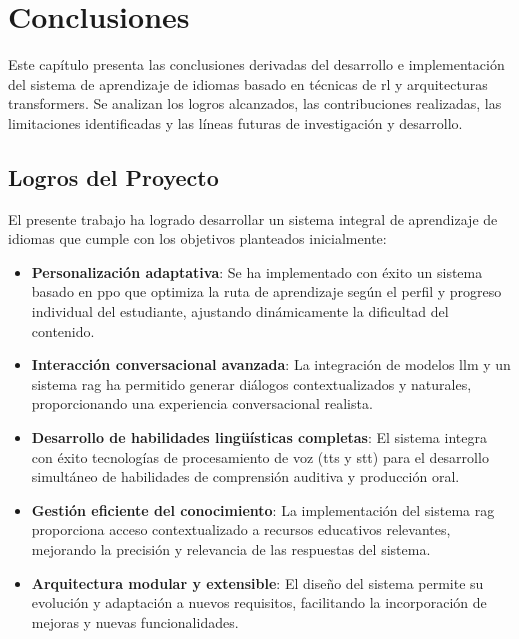 \chapter{Conclusiones}
\label{conclusiones}

Este capítulo presenta las conclusiones derivadas del desarrollo e implementación del sistema de aprendizaje de idiomas basado en técnicas de \gls{rl} y arquitecturas \gls{transformers}. Se analizan los logros alcanzados, las contribuciones realizadas, las limitaciones identificadas y las líneas futuras de investigación y desarrollo.

\section{Logros del Proyecto}
\label{sec:logros-proyecto}

El presente trabajo ha logrado desarrollar un sistema integral de aprendizaje de idiomas que cumple con los objetivos planteados inicialmente:

\begin{itemize}
    \item \textbf{Personalización adaptativa}: Se ha implementado con éxito un sistema basado en \gls{ppo} que optimiza la ruta de aprendizaje según el perfil y progreso individual del estudiante, ajustando dinámicamente la dificultad del contenido.
    
    \item \textbf{Interacción conversacional avanzada}: La integración de modelos \gls{llm} y un sistema \gls{rag} ha permitido generar diálogos contextualizados y naturales, proporcionando una experiencia conversacional realista.
    
    \item \textbf{Desarrollo de habilidades lingüísticas completas}: El sistema integra con éxito tecnologías de procesamiento de voz (\gls{tts} y \gls{stt}) para el desarrollo simultáneo de habilidades de comprensión auditiva y producción oral.
    
    \item \textbf{Gestión eficiente del conocimiento}: La implementación del sistema \gls{rag} proporciona acceso contextualizado a recursos educativos relevantes, mejorando la precisión y relevancia de las respuestas del sistema.
    
    \item \textbf{Arquitectura modular y extensible}: El diseño del sistema permite su evolución y adaptación a nuevos requisitos, facilitando la incorporación de mejoras y nuevas funcionalidades.
\end{itemize}


